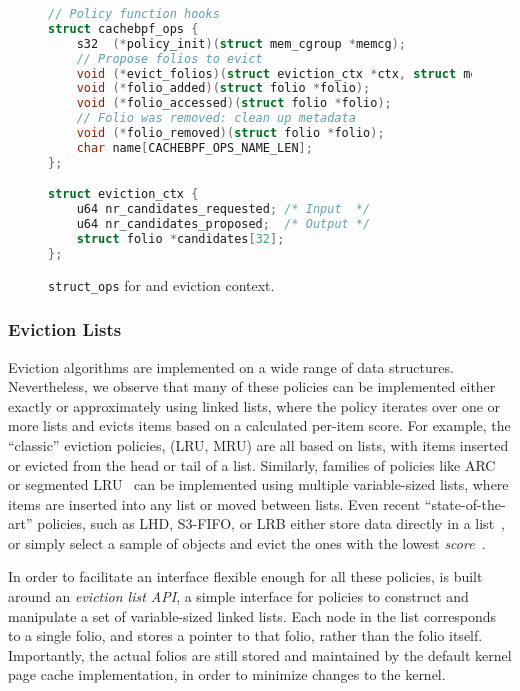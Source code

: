 \begin{figure}
    \centering
    \begin{lstlisting}[language=C]
// Policy function hooks
struct cachebpf_ops {
    s32  (*policy_init)(struct mem_cgroup *memcg);
    // Propose folios to evict
    void (*evict_folios)(struct eviction_ctx *ctx, struct mem_cgroup *memcg);
    void (*folio_added)(struct folio *folio);
    void (*folio_accessed)(struct folio *folio);
    // Folio was removed: clean up metadata
    void (*folio_removed)(struct folio *folio);
    char name[CACHEBPF_OPS_NAME_LEN];
};

struct eviction_ctx {
    u64 nr_candidates_requested; /* Input  */
    u64 nr_candidates_proposed;  /* Output */
    struct folio *candidates[32];
};
    \end{lstlisting}
    \caption{\texttt{struct\_ops} for \name and eviction context.}
    \label{fig:cache-ext-ops}
\end{figure}



\subsubsection{Eviction Lists}
\label{subsubsec:design_eviction_lists}

Eviction algorithms are implemented on a wide range of data structures. 
Nevertheless, we observe that many of these policies can be implemented either exactly or approximately using linked lists, where the policy iterates over one or more lists and evicts items based on a calculated per-item score. For example, the ``classic'' eviction policies, (\eg LRU, MRU) are all based on lists, with items inserted or evicted from the head or tail of a list. Similarly, families of policies like ARC~\cite{arc} or segmented LRU~\cite{segmented} can be implemented using multiple variable-sized lists, where items are inserted into any list or moved between lists. Even recent ``state-of-the-art'' policies, such as LHD, S3-FIFO, or LRB either store data directly in a list~\cite{s3-fifo,sieve}, or simply select a sample of objects and evict the ones with the lowest \emph{score}~\cite{lhd,lrb}. 

In order to facilitate an interface flexible enough for all these policies, \name is built around an \emph{eviction list API}, a simple interface for policies to construct and manipulate a set of variable-sized linked lists. Each node in the list corresponds to a single folio, and stores a pointer to that folio, rather than the folio itself. Importantly, the actual folios are still stored and maintained by the default kernel page cache implementation, in order to minimize changes to the kernel.

